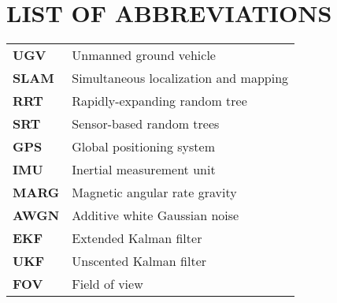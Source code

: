 
\section*{LIST OF ABBREVIATIONS}

\begin{tabular}{p{3cm}l}
  \textbf{UGV} &  Unmanned ground vehicle \\
  \textbf{SLAM} &  Simultaneous localization and mapping \\
  \textbf{RRT} & Rapidly-expanding random tree \\
  \textbf{SRT} & Sensor-based random trees \\
  \textbf{GPS} & Global positioning system \\
  \textbf{IMU} & Inertial measurement unit \\
  \textbf{MARG} & Magnetic angular rate gravity \\
  \textbf{AWGN} & Additive white Gaussian noise \\
  \textbf{EKF} & Extended Kalman filter \\
  \textbf{UKF} & Unscented Kalman filter \\
  \textbf{FOV} & Field of view
\end{tabular}


